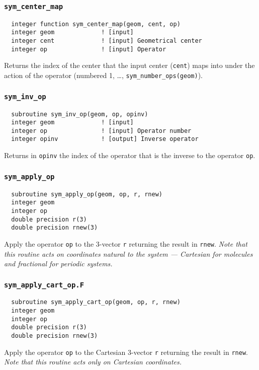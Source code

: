 \subsubsection{{\tt sym\_center\_map}}
\begin{verbatim}
  integer function sym_center_map(geom, cent, op)
  integer geom             ! [input]
  integer cent             ! [input] Geometrical center
  integer op               ! [input] Operator
\end{verbatim}
Returns the index of the center that the input center
(\verb+cent+) maps into under the action of the operator
(numbered 1, \ldots, \verb+sym_number_ops(geom)+).

\subsubsection{{\tt sym\_inv\_op}}
\label{sec:syminvop}
\begin{verbatim}
  subroutine sym_inv_op(geom, op, opinv)
  integer geom             ! [input]
  integer op               ! [input] Operator number
  integer opinv            ! [output] Inverse operator
\end{verbatim}
Returns in \verb+opinv+ the index of the operator that is
the inverse to the operator \verb+op+.

\subsubsection{{\tt sym\_apply\_op}}
\begin{verbatim}
  subroutine sym_apply_op(geom, op, r, rnew)
  integer geom
  integer op
  double precision r(3)
  double precision rnew(3)
\end{verbatim}
Apply the operator \verb+op+ to the 3-vector \verb+r+ returning the
result in \verb+rnew+.  {\em Note that this routine acts on
  coordinates natural to the system --- Cartesian for molecules and
  fractional for periodic systems.}

\subsubsection{{\tt sym\_apply\_cart\_op.F}}
\begin{verbatim}
  subroutine sym_apply_cart_op(geom, op, r, rnew)
  integer geom
  integer op
  double precision r(3)
  double precision rnew(3)
\end{verbatim}
Apply the operator \verb+op+ to the Cartesian 3-vector \verb+r+
returning the result in \verb+rnew+.  {\em Note that this routine acts
  only on Cartesian coordinates.}

